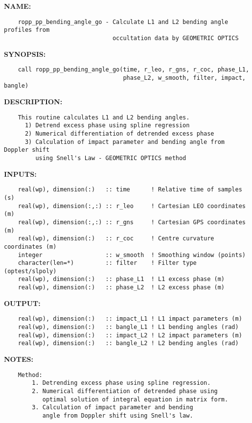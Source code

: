 \label{ch:robo18}
\label{ch:GeometricOptics_ropp_pp_bending_angle_go}
\textbf{NAME:}\hspace{0.08in}\begin{Verbatim}
    ropp_pp_bending_angle_go - Calculate L1 and L2 bending angle profiles from
                               occultation data by GEOMETRIC OPTICS
\end{Verbatim}
\textbf{SYNOPSIS:}\hspace{0.08in}\begin{Verbatim}
    call ropp_pp_bending_angle_go(time, r_leo, r_gns, r_coc, phase_L1,
                                  phase_L2, w_smooth, filter, impact, bangle)
\end{Verbatim}
\textbf{DESCRIPTION:}\hspace{0.08in}\begin{Verbatim}
    This routine calculates L1 and L2 bending angles.
      1) Detrend excess phase using spline regression
      2) Numerical differentiation of detrended excess phase
      3) Calculation of impact parameter and bending angle from Doppler shift
         using Snell's Law - GEOMETRIC OPTICS method
\end{Verbatim}
\textbf{INPUTS:}\hspace{0.08in}\begin{Verbatim}
    real(wp), dimension(:)   :: time      ! Relative time of samples (s)
    real(wp), dimension(:,:) :: r_leo     ! Cartesian LEO coordinates (m)
    real(wp), dimension(:,:) :: r_gns     ! Cartesian GPS coordinates (m)
    real(wp), dimension(:)   :: r_coc     ! Centre curvature coordinates (m)
    integer                  :: w_smooth  ! Smoothing window (points)
    character(len=*)         :: filter    ! Filter type (optest/slpoly)
    real(wp), dimension(:)   :: phase_L1  ! L1 excess phase (m)
    real(wp), dimension(:)   :: phase_L2  ! L2 excess phase (m)
\end{Verbatim}
\textbf{OUTPUT:}\hspace{0.08in}\begin{Verbatim}
    real(wp), dimension(:)   :: impact_L1 ! L1 impact parameters (m)
    real(wp), dimension(:)   :: bangle_L1 ! L1 bending angles (rad)
    real(wp), dimension(:)   :: impact_L2 ! L2 impact parameters (m)
    real(wp), dimension(:)   :: bangle_L2 ! L2 bending angles (rad)
\end{Verbatim}
\textbf{NOTES:}\hspace{0.08in}\begin{Verbatim}
    Method:
        1. Detrending excess phase using spline regression.
        2. Numerical differentiation of detrended phase using
           optimal solution of integral equation in matrix form.
        3. Calculation of impact parameter and bending
           angle from Doppler shift using Snell's law.
\end{Verbatim}
